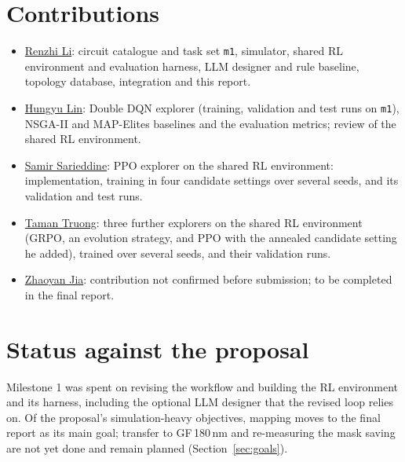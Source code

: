 \documentclass[10pt]{article}
\begin{document}
\appendix
{}
\section{Contributions}\label{app:who}
\begin{itemize}
  \item \uline{Renzhi Li}: circuit catalogue and task set \texttt{m1}, simulator, shared RL environment
  and evaluation harness, LLM designer and rule baseline, topology database, integration and this report.
  \item \uline{Hungyu Lin}: Double DQN explorer (training, validation and test runs on \texttt{m1}), NSGA-II and
  MAP-Elites baselines and the evaluation metrics; review of the shared RL environment.
  \item \uline{Samir Sarieddine}: PPO explorer on the shared RL environment: implementation, training in four candidate
  settings over several seeds, and its validation and test runs.
  \item \uline{Taman Truong}: three further explorers on the shared RL environment (GRPO, an evolution strategy, and
  PPO with the annealed candidate setting he added), trained over several seeds, and their validation runs.
  \item \uline{Zhaoyan Jia}: contribution not confirmed before submission; to be completed in the final report.
\end{itemize}

\section{Status against the proposal}\label{app:status}
Milestone 1 was spent on revising the workflow and building the RL environment and its harness, including the
optional LLM designer that the revised loop relies on. Of the proposal's simulation-heavy objectives, mapping moves to the final report as its main goal;
transfer to GF\,180\,nm and re-measuring the mask saving are not yet done and remain planned (Section~\ref{sec:goals}).
\end{document}

